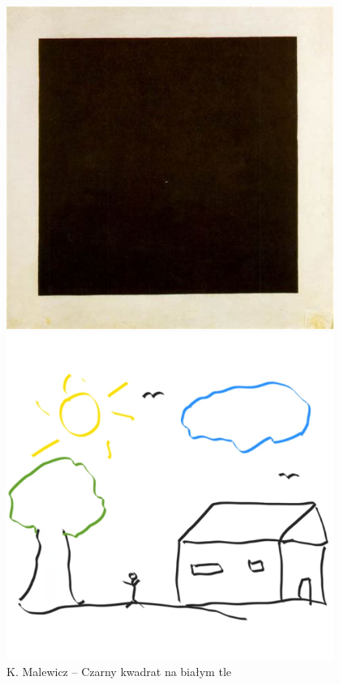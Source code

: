 \documentclass{article}
\begin{document}
\begin{figure}[h]
  \begin{minipage}{0.31\textwidth}
    \includegraphics[width=0.95\textwidth]{malewiczkwadrat}
    \caption{K. Malewicz -- Czarny kwadrat na białym tle}\label{fig:malewiczkwadrat}
  \end{minipage}
  \hfill
  \begin{minipage}{0.31\textwidth}
    \includegraphics[width=0.95\textwidth]{behandomek}

\end{minipage}
\end{figure}
\end{document}
